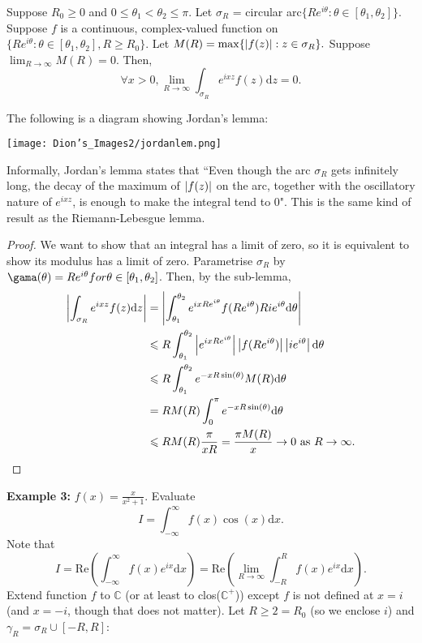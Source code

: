 \begin{lem}
Suppose $R_0 \geq 0$ and $0 \leq \theta_1 < \theta_2 \leq \pi$.
Let $\sigma_R$ = circular arc$\{Re^{i\theta}: \theta \in [\theta_1, \theta_2]\}.$
Suppose $f$ is a continuous, complex-valued function on $\{Re^{i\theta}: \theta \in [\theta_1, \theta_2], R \geq R_0\}.$
Let $M(R) = \max\{\left\lvert f(z)\right\rvert: z \in \sigma_R\}.$
Suppose $\lim_{R\rightarrow\infty} M(R) = 0$.
Then, $$\forall x > 0, \lim_{R\rightarrow\infty} \int_{\sigma_R} e^{ixz} f(z) \mathrm{d}z = 0.$$
\end{lem}
The following is a diagram showing Jordan's lemma:

\centerline{\texttt{[image: Dion's\_Images2/jordanlem.png]}}

Informally, Jordan's lemma states that ``Even though the arc $\sigma_R$ gets infinitely long, the decay of the maximum of $\left\lvert f(z)\right\rvert$ on the arc,
together with the oscillatory nature of $e^{ixz}$, is enough to make the integral tend to 0". 
This is the same kind of result as the Riemann-Lebesgue lemma.

\begin{proof}
We want to show that an integral has a limit of zero, so it is equivalent to show its modulus has a limit of zero.
Parametrise $\sigma_R$ by $\gama(\theta) = Re^{i\theta} for \theta \in [\theta_1, \theta_2]$. Then, by the sub-lemma,
\begin{align*}
\left\lvert\int_{\sigma_R} e^{ixz} f(z) \mathrm{d}z\right\rvert &= \left\lvert\int_{\theta_1}^{\theta_2} e^{ixRe^{i\theta}}f(Re^{i\theta}) Rie^{i\theta} \mathrm{d}\theta\right\rvert \\
&\leqslant R\int_{\theta_1}^{\theta_2} \left\lvert e^{ixRe^{i\theta}}\right\rvert\left\lvert f(Re^{i\theta})\right\rvert \left\lvert ie^{i\theta}\right\rvert \mathrm{d}\theta \\
&\leqslant R\int_{\theta_1}^{\theta_2} e^{-xR\sin(\theta)} M(R) \mathrm{d}\theta \\
&= RM(R)\int_0^\pi e^{-xR\sin(\theta)} \mathrm{d}\theta \\
&\leqslant RM(R)\frac{\pi}{xR} = \frac{\pi M(R)}{x} \rightarrow 0 \mbox{ as } R \rightarrow \infty.
\end{align*}
\end{proof}

\medskip\textbf{Example 3:}
$f(x) = \frac{x}{x^2 + 1}$. Evaluate 
$$I = \int_{-\infty}^{\infty} f(x) \cos(x) \mathrm{d}x.$$
Note that 
$$I = \mbox{Re}\left(\int_{-\infty}^{\infty} f(x)e^{ix} \mathrm{d}x \right) = \mbox{Re}\left(\lim_{R \rightarrow \infty}\int_{-R}^{R} f(x)e^{ix} \mathrm{d}x \right).$$
Extend function $f$ to $\mathbb{C}$ (or at least to clos($\mathbb{C}^+$)) except $f$ is not defined at $x = i$ (and $x = -i$, though that does not matter).
Let $R \geq 2 = R_0$ (so we enclose $i$) and $\gamma_R = \sigma_R \cup [-R,R]$:

